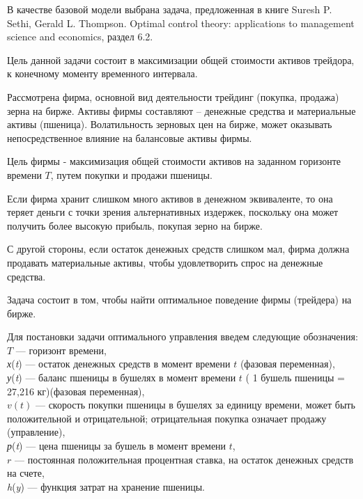 
В качестве базовой модели выбрана задача, предложенная в книге Suresh P. Sethi, Gerald L. Thompson.  Optimal control theory: applications to management science and economics, раздел 6.2.\cite{b8}

Цель данной задачи состоит в максимизации общей стоимости активов трейдора, к конечному моменту временного интервала.

Рассмотрена фирма, основной вид деятельности трейдинг (покупка, продажа) зерна на бирже. Активы фирмы составляют – денежные средства и материальные активы (пшеница). Волатильность зерновых цен на бирже, может оказывать непосредственное влияние на балансовые активы фирмы. 

Цель фирмы - максимизация общей стоимости активов на заданном горизонте времени $T$, путем покупки и продажи пшеницы.


Если фирма хранит слишком много активов в денежном эквиваленте, то она теряет деньги с точки зрения альтернативных издержек, поскольку она может получить более высокую прибыль, покупая  зерно на бирже.

С другой стороны, если остаток денежных средств слишком мал, фирма должна продавать материальные активы, чтобы удовлетворить спрос на денежные средства.

Задача состоит в том, чтобы найти оптимальное поведение фирмы (трейдера) на бирже.

Для постановки задачи оптимального управления введем следующие обозначения:\\
\begin{math} T \end{math} --- горизонт времени,\\
\emph {х}(\emph{t}) --- остаток денежных средств в момент времени $t$ (фазовая переменная),\\
\emph {у}(\emph{t})  --- баланс пшеницы в бушелях в момент времени $t$ ( 1 бушель пшеницы = 27,216 кг)(фазовая переменная),\\ 
${v(t)}$ --- скорость покупки пшеницы в бушелях за единицу времени, может быть положительной и отрицательной; отрицательная покупка означает продажу (управление),\\
\emph {р}(\emph{t}) --- цена пшеницы за бушель в момент времени $t$,\\
${r}$ --- постоянная положительная процентная ставка, на остаток денежных средств на счете,\\
\emph {h}(\emph{y}) --- функция затрат на хранение пшеницы.
 
